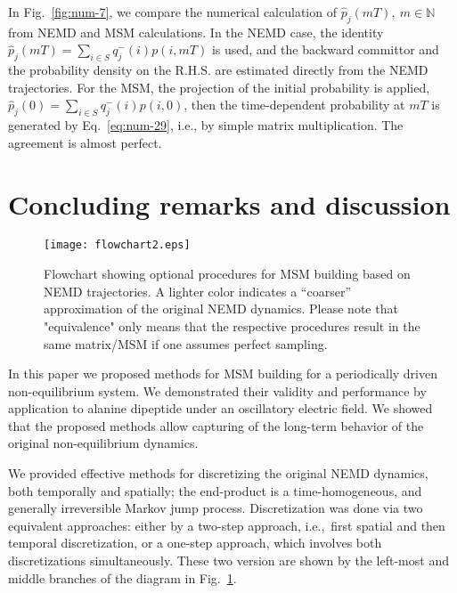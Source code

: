 \documentclass[journal=jctcce,manuscript=article]{achemso}
\newcommand{\bwd}[0]{-}
\begin{document}
In Fig.~\ref{fig:num-7}, we compare the numerical calculation of $\hat p_j (mT), \ m\in\mathbb N$ from NEMD and MSM calculations.
In the NEMD case, the identity  $\hat p_j (mT) = \sum_{i\in S}  q^\bwd_j(i)  p(i,mT) $ is used, and
the backward committor and the probability density on the R.H.S.
are estimated directly from the
NEMD trajectories. For the MSM, the projection of the initial probability is applied, $\hat p_j (0) = \sum_{i\in S}  q^\bwd_j(i)  p(i,0) $, then
the time-dependent probability at $mT$ is generated by Eq.~\eqref{eq:num-29}, i.e., by simple matrix multiplication. The agreement is almost perfect.



\section{Concluding remarks and discussion}
\label{sec:conclusion}

\begin{figure}
  \centering
  \texttt{[image: flowchart2.eps]}
  \caption{Flowchart showing optional procedures for MSM building based on NEMD trajectories. A lighter color indicates
  a ``coarser'' approximation of the original NEMD dynamics. Please note that "equivalence" only means that the respective procedures result in the same matrix/MSM if one assumes perfect sampling.}
  \label{fig:flowchart}
\end{figure}

In this paper we proposed methods for MSM building for a periodically driven
non-equilibrium system. We demonstrated their validity and performance by application to  alanine dipeptide under an oscillatory electric field. We showed that the proposed 
methods allow capturing of the long-term behavior of the original
non-equilibrium dynamics.

We provided effective methods for discretizing the original NEMD dynamics,
both temporally and spatially; the end-product is a time-homogeneous, and  generally irreversible Markov jump process.
Discretization was done via two equivalent approaches:
either by a two-step approach,
i.e.,~first spatial and then temporal discretization,
or a one-step approach, which involves both discretizations simultaneously.
These two version are shown by the left-most and middle branches of the diagram  in Fig.~\ref{fig:flowchart}.
\end{document}
